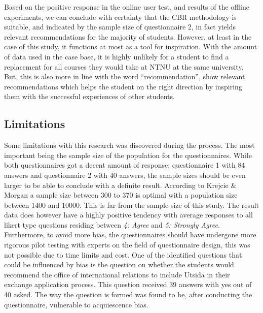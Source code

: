 Based on the positive response in the online user test, and results of the offline experiments, we can conclude with certainty that the CBR methodology is suitable, and indicated by the sample size of questionnaire 2, in fact yields relevant recommendations for the majority of students. However, at least in the case of this study, it functions at most as a tool for inspiration. With the amount of data used in the case base, it is highly unlikely for a student to find a replacement for all courses they would take at NTNU at the same university. But, this is also more in line with the word \enquote{recommendation}, show relevant recommendations which helps the student on the right direction by inspiring them with the successful experiences of other students. 

\subsection{Limitations}
Some limitations with this research was discovered during the process. The most important being the sample size of the population for the questionnaires. While both questionnaires got a decent amount of response; questionnaire 1 with 84 answers and questionnaire 2 with 40 answers, the sample sizes should be even larger to be able to conclude with a definite result. According to Krejcie \& Morgan\cite{krejcie1970determining} a sample size between 300 to 370 is optimal with a population size between 1400 and 10000. This is far from the sample size of this study. The result data does however have a highly positive tendency with average responses to all likert type questions residing between \textit{4: Agree} and \textit{5: Strongly Agree}. Furthermore, to avoid more bias, the questionnaires should have undergone more rigorous pilot testing with experts on the field of questionnaire design, this was not possible due to time limits and cost. One of the identified questions that could be influenced by bias is the question on whether the students would recommend the office of international relations to include Utsida in their exchange application process. This question received 39 answers with yes out of 40 asked. The way the question is formed was found to be, after conducting the questionnaire, vulnerable to acquiescence bias.



